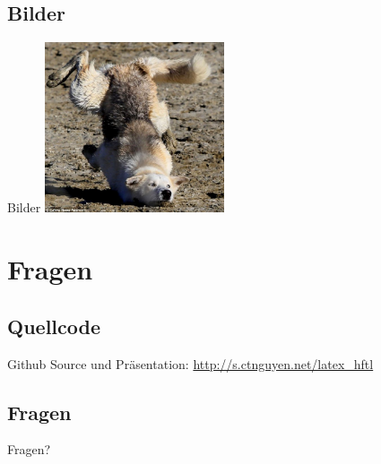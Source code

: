\documentclass[xcolor=x11names,compress]{beamer} %
\renewcommand{\(}{\begin{columns}}
\renewcommand{\)}{\end{columns}}
\newcommand{\<}[1]{\begin{column}{#1}}
\renewcommand{\>}{\end{column}}
\begin{document}
	\subsection{Bilder}
		\begin{frame}{Bilder}
			\includegraphics[width=200px]{images/GiSapDA.jpg}
		\end{frame}

\section{Fragen}
	\subsection{Quellcode}
		\begin{frame}
			Github Source und Präsentation:
			\href{http://s.ctnguyen.net/latex_hftl}{http://s.ctnguyen.net/latex\_hftl}
		\end{frame}

	\subsection{Fragen}
		\begin{frame}
			\huge{Fragen?}
		\end{frame}
\end{document}
